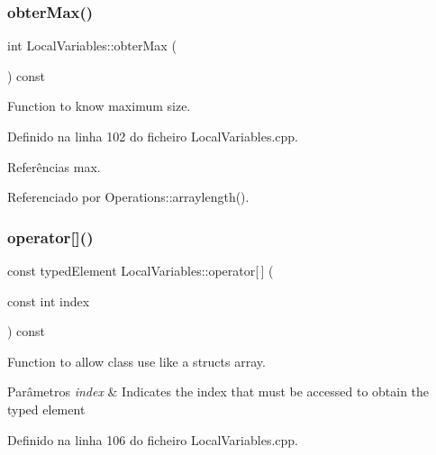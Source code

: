 \mbox{\label{classLocalVariables_acf8ee1db2a3427c30eb3e489d7a4478c}} 
\subsubsection{\texorpdfstring{obter\+Max()}{obterMax()}}
{\footnotesize\ttfamily int Local\+Variables\+::obter\+Max (\begin{DoxyParamCaption}{ }\end{DoxyParamCaption}) const}



Function to know maximum size. 



Definido na linha 102 do ficheiro Local\+Variables.\+cpp.



Referências max.



Referenciado por Operations\+::arraylength().

\mbox{\label{classLocalVariables_a6e978f3c992385f2909261e995105142}} 
\subsubsection{\texorpdfstring{operator[]()}{operator[]()}}
{\footnotesize\ttfamily const typed\+Element Local\+Variables\+::operator\mbox{[}$\,$\mbox{]} (\begin{DoxyParamCaption}\item[{const int}]{index }\end{DoxyParamCaption}) const}



Function to allow class use like a struct\textquotesingle{}s array. 


\begin{DoxyParams}{Parâmetros}
{\em index} & Indicates the index that must be accessed to obtain the typed element \\
\hline
\end{DoxyParams}


Definido na linha 106 do ficheiro Local\+Variables.\+cpp.

